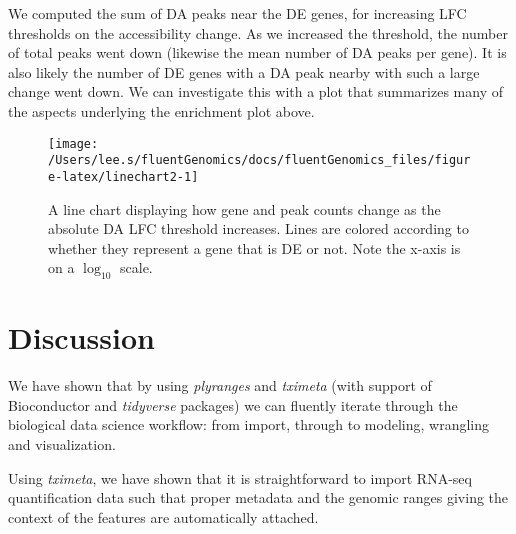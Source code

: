 \documentclass[
]{article}
\newenvironment{Shaded}{}{}
\newcommand{\DataTypeTok}[1]{\textcolor[rgb]{0.56,0.13,0.00}{#1}}
\newcommand{\DecValTok}[1]{\textcolor[rgb]{0.25,0.63,0.44}{#1}}
\newcommand{\KeywordTok}[1]{\textcolor[rgb]{0.00,0.44,0.13}{\textbf{#1}}}
\newcommand{\NormalTok}[1]{#1}
\newcommand{\OperatorTok}[1]{\textcolor[rgb]{0.40,0.40,0.40}{#1}}
\newcommand{\StringTok}[1]{\textcolor[rgb]{0.25,0.44,0.63}{#1}}
\begin{document}
We computed the sum of DA peaks near the DE genes, for increasing LFC
thresholds on the accessibility change. As we increased the threshold, the
number of total peaks went down (likewise the mean number of DA peaks per
gene). It is also likely the number of DE genes with a DA peak nearby with such
a large change went down. We can investigate this with a plot that summarizes
many of the aspects underlying the enrichment plot above.

\begin{Shaded}
\end{Shaded}

\begin{figure}

{\centering \texttt{[image: /Users/lee.s/fluentGenomics/docs/fluentGenomics\_files/figure-latex/linechart2-1]} 

}

\caption{A line chart displaying how gene and peak counts change as the
absolute DA LFC threshold increases. Lines are colored according to whether
they represent a gene that is DE or not. Note the x-axis is on a \(\log_10\)
scale.}\label{fig:linechart2}
\end{figure}

\hypertarget{discussion}{%
\section{Discussion}\label{discussion}}

We have shown that by using \emph{plyranges} and \emph{tximeta} (with support of
Bioconductor and \emph{tidyverse} packages) we can fluently iterate through the
biological data science workflow: from import, through to modeling, wrangling
and visualization.

Using \emph{tximeta}, we have shown that it is straightforward to import RNA-seq
quantification data such that proper metadata and the genomic ranges giving the
context of the features are automatically attached.
\end{document}
